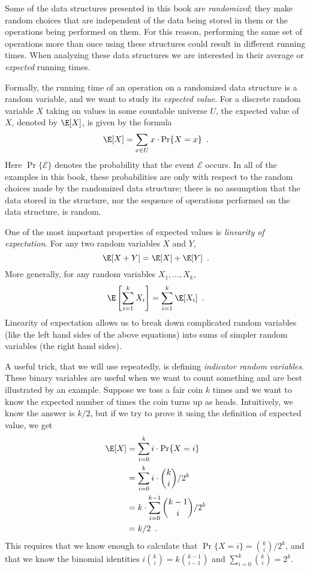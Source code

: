 %
%
%
%
Some of the data structures presented in this book are \emph{randomized};
they make random choices that are independent of the data being stored
in them or the operations being performed on them.  For this reason,
performing the same set of operations more than once using these
structures could result in different running times.  When analyzing these
data structures we are interested in their average or \emph{expected}
running times.
%
%

Formally, the running time of an operation on a randomized data structure
is a random variable, and we want to study its \emph{expected value}.
%
For
a discrete random variable $X$ taking on values in some countable
universe $U$, the expected value of $X$, denoted by $\E[X]$, is given
by the formula
\[
    \E[X] = \sum_{x\in U} x\cdot\Pr\{X=x\} \enspace .
\]
Here $\Pr\{\mathcal{E}\}$ denotes the probability that the event
$\mathcal{E}$ occurs.  In all of the examples in this book, these
probabilities are only with respect to the random choices made by the
randomized data structure;  there is no assumption that the data stored
in the structure, nor the sequence of operations performed on the
data structure, is random.

One of the most important properties of expected values is \emph{linearity
of expectation}.
%
For any two random variables $X$ and $Y$,
\[
   \E[X+Y] = \E[X] + \E[Y] \enspace .
\]
More generally, for any random variables $X_1,\ldots,X_k$,
\[
   \E\left[\sum_{i=1}^k X_i\right] = \sum_{i=1}^k \E[X_i] \enspace .
\]
Linearity of expectation allows us to break down complicated random variables (like the left hand sides of the above equations) into sums of simpler random variables (the right hand sides).

A useful trick, that we will use repeatedly, is defining \emph{indicator
random variables}.
%
These binary variables are useful when we want to
count something and are best illustrated by an example.  Suppose we toss
a fair coin $k$ times and we want to know the expected number of times
the coin turns up as heads.
%
Intuitively, we know the answer is $k/2$,
but if we try to prove it using the definition of expected value, we get
\begin{align*}
   \E[X] & = \sum_{i=0}^k i\cdot\Pr\{X=i\} \\
         & = \sum_{i=0}^k i\cdot\binom{k}{i}/2^k \\
         & = k\cdot \sum_{i=0}^{k-1}\binom{k-1}{i}/2^k \\
         & = k/2 \enspace .
\end{align*}
This requires that we know enough to calculate that $\Pr\{X=i\}
= \binom{k}{i}/2^k$, and that we know the binomial identities
$i\binom{k}{i}=k\binom{k-1}{i-1}$ and $\sum_{i=0}^{k} \binom{k}{i} = 2^{k}$.


